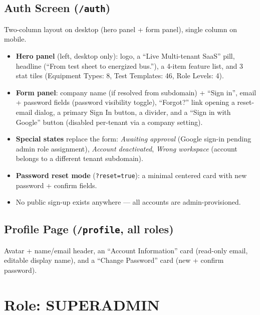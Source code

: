 \documentclass[11pt]{article}
\begin{document}
\subsection{Auth Screen (\texttt{/auth})}
Two-column layout on desktop (hero panel + form panel), single column on mobile.
\begin{itemize}[nosep]
  \item \textbf{Hero panel} (left, desktop only): logo, a ``Live \textperiodcentered{}
    Multi-tenant SaaS'' pill, headline (``From test sheet to energized bus.''), a 4-item feature
    list, and 3 stat tiles (Equipment Types: 8, Test Templates: 46, Role Levels: 4).
  \item \textbf{Form panel}: company name (if resolved from subdomain) + ``Sign in'', email +
    password fields (password visibility toggle), ``Forgot?'' link opening a reset-email dialog,
    a primary Sign In button, a divider, and a ``Sign in with Google'' button (disabled per-tenant
    via a company setting).
  \item \textbf{Special states} replace the form: \emph{Awaiting approval} (Google sign-in pending
    admin role assignment), \emph{Account deactivated}, \emph{Wrong workspace} (account belongs to
    a different tenant subdomain).
  \item \textbf{Password reset mode} (\texttt{?reset=true}): a minimal centered card with new
    password + confirm fields.
  \item No public sign-up exists anywhere --- all accounts are admin-provisioned.
\end{itemize}

\subsection{Profile Page (\texttt{/profile}, all roles)}
Avatar + name/email header, an ``Account Information'' card (read-only email, editable display
name), and a ``Change Password'' card (new + confirm password).

\section{Role: SUPERADMIN}
\end{document}
